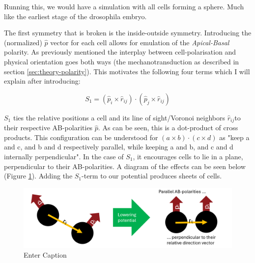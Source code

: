 Running this, we would have a simulation with all cells forming a sphere. Much like the earliest stage of the drosophila embryo.

The first symmetry that is broken is the inside-outside symmetry. Introducing the (normalized) $\hat{p}$ vector for each cell allows for emulation of the \textit{Apical-Basal} polarity.
As previously mentioned the interplay between cell-polarisation and physical orientation goes both ways (the mechanotransduction as described in section \ref{sec:theory-polarity}). This motivates the following four terms which I will explain after introducing:

\begin{equation*}
    S_1=\left(\hat{p}_i \times \hat{r}_{i j}\right) \cdot\left(\hat{p}_j \times \hat{r}_{i j}\right)
\end{equation*}

$S_1$ ties the relative positions a cell and its line of sight/Voronoi neighbors $\hat{r}_{i j}$to their respective AB-polarities $\hat{p}$.
As can be seen, this is a dot-product of cross products. This configuration can be understood for $\left(a \times b\right) \cdot\left(c \times d\right)$ as "keep a and c, and b and d respectively parallel, while keeping a and b, and c and d internally perpendicular". In the case of $S_1$, it encourages cells to lie in a plane, perpendicular to their AB-polarities. A diagram of the effects can be seen below (Figure \ref{fig:explain-S1}). Adding the $S_1$-term to our potential produces sheets of cells. 


\begin{figure}[H]
    \centering
    \includegraphics[width=1\linewidth]{chapters//Theory//figures/explainS1.png}
    \caption{Enter Caption}
    \label{fig:explain-S1}
\end{figure}

